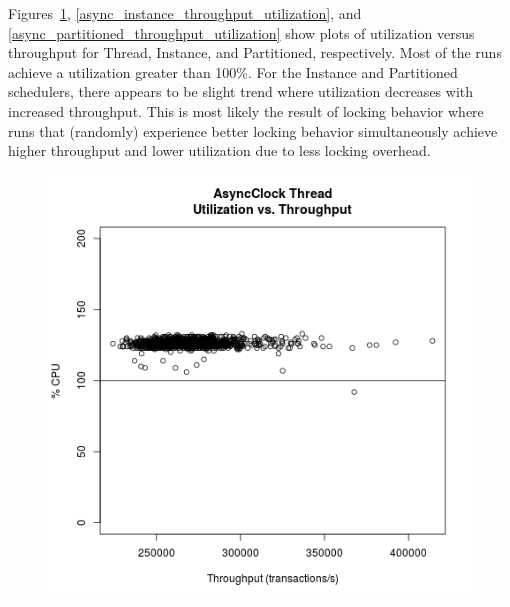 Figures~\ref{async_thread_throughput_utilization}, \ref{async_instance_throughput_utilization}, and \ref{async_partitioned_throughput_utilization} show plots of utilization versus throughput for Thread, Instance, and Partitioned, respectively.
Most of the runs achieve a utilization greater than 100\%.
For the Instance and Partitioned schedulers, there appears to be slight trend where utilization decreases with increased throughput.
This is most likely the result of locking behavior where runs that (randomly) experience better locking behavior simultaneously achieve higher throughput and lower utilization due to less locking overhead.

\begin{figure}
\center
\includegraphics[height=.4\textheight]{async_thread_throughput_utilization.png}
\caption{\label{async_thread_throughput_utilization}}
\end{figure}


